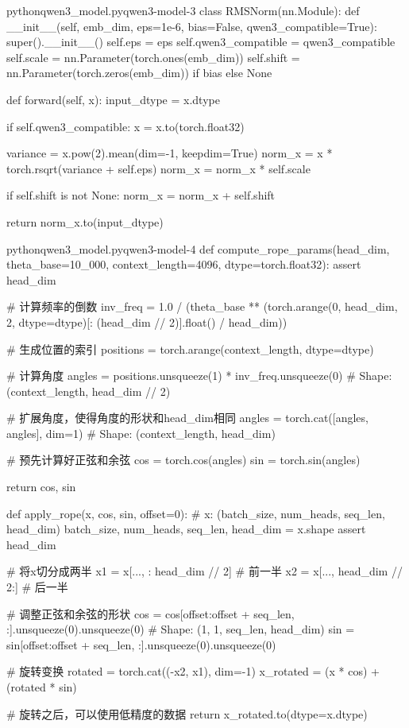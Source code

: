 \documentclass[lang=cn,newtx,10pt,scheme=chinese]{elegantbook}
\begin{document}
\begin{codebox}{python}{qwen3\_model.py}{qwen3-model-3}
class RMSNorm(nn.Module):
    def __init__(self, emb_dim, eps=1e-6, bias=False, qwen3_compatible=True):
        super().__init__()
        self.eps = eps
        self.qwen3_compatible = qwen3_compatible
        self.scale = nn.Parameter(torch.ones(emb_dim))
        self.shift = nn.Parameter(torch.zeros(emb_dim)) if bias else None

    def forward(self, x):
        input_dtype = x.dtype

        if self.qwen3_compatible:
            x = x.to(torch.float32)

        variance = x.pow(2).mean(dim=-1, keepdim=True)
        norm_x = x * torch.rsqrt(variance + self.eps)
        norm_x = norm_x * self.scale

        if self.shift is not None:
            norm_x = norm_x + self.shift

        return norm_x.to(input_dtype)
\end{codebox}

\begin{codebox}{python}{qwen3\_model.py}{qwen3-model-4}
def compute_rope_params(head_dim, theta_base=10_000, context_length=4096, dtype=torch.float32):
    assert head_dim %

    # 计算频率的倒数
    inv_freq = 1.0 / (theta_base ** (torch.arange(0, head_dim, 2, dtype=dtype)[: (head_dim // 2)].float() / head_dim))

    # 生成位置的索引
    positions = torch.arange(context_length, dtype=dtype)

    # 计算角度
    angles = positions.unsqueeze(1) * inv_freq.unsqueeze(0)  # Shape: (context_length, head_dim // 2)

    # 扩展角度，使得角度的形状和head_dim相同
    angles = torch.cat([angles, angles], dim=1)  # Shape: (context_length, head_dim)

    # 预先计算好正弦和余弦
    cos = torch.cos(angles)
    sin = torch.sin(angles)

    return cos, sin


def apply_rope(x, cos, sin, offset=0):
    # x: (batch_size, num_heads, seq_len, head_dim)
    batch_size, num_heads, seq_len, head_dim = x.shape
    assert head_dim %

    # 将x切分成两半
    x1 = x[..., : head_dim // 2]  # 前一半
    x2 = x[..., head_dim // 2:]  # 后一半

    # 调整正弦和余弦的形状
    cos = cos[offset:offset + seq_len, :].unsqueeze(0).unsqueeze(0)  # Shape: (1, 1, seq_len, head_dim)
    sin = sin[offset:offset + seq_len, :].unsqueeze(0).unsqueeze(0)

    # 旋转变换
    rotated = torch.cat((-x2, x1), dim=-1)
    x_rotated = (x * cos) + (rotated * sin)

    # 旋转之后，可以使用低精度的数据
    return x_rotated.to(dtype=x.dtype)
\end{codebox}
\end{document}
